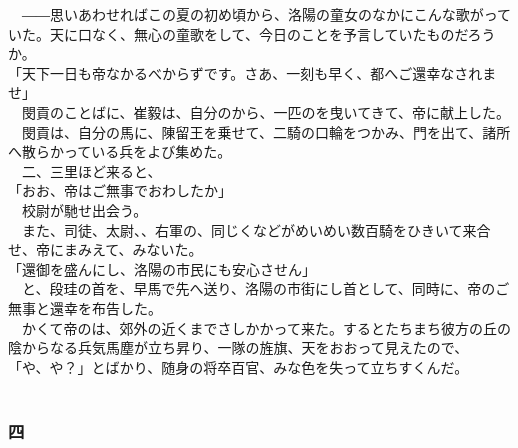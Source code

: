 \documentclass[
  paper=a5,
  fontsize=10pt,
  jafontsize=9.5pt,
  tate,                  %
  open_bracket_pos=nibu, %
]{jlreq}
\begin{document}
　――思いあわせればこの夏の初め頃から、洛陽の童女のなかにこんな歌がっていた。天に口なく、無心の童歌をして、今日のことを予言していたものだろうか。\\


「天下一日も帝なかるべからずです。さあ、一刻も早く、都へご還幸なされませ」\\


　閔貢のことばに、崔毅は、自分のから、一匹のを曳いてきて、帝に献上した。\\


　閔貢は、自分の馬に、陳留王を乗せて、二騎の口輪をつかみ、門を出て、諸所へ散らかっている兵をよび集めた。\\


　二、三里ほど来ると、\\


「おお、帝はご無事でおわしたか」\\


　校尉が馳せ出会う。\\


　また、司徒、太尉、、右軍の、同じくなどがめいめい数百騎をひきいて来合せ、帝にまみえて、みないた。\\


「還御を盛んにし、洛陽の市民にも安心させん」\\


　と、段珪の首を、早馬で先へ送り、洛陽の市街にし首として、同時に、帝のご無事と還幸を布告した。\\


　かくて帝のは、郊外の近くまでさしかかって来た。するとたちまち彼方の丘の陰からなる兵気馬塵が立ち昇り、一隊の旌旗、天をおおって見えたので、\\


「や、や？」とばかり、随身の将卒百官、みな色を失って立ちすくんだ。\\

\\

\subsubsection{四}

\\
\end{document}
